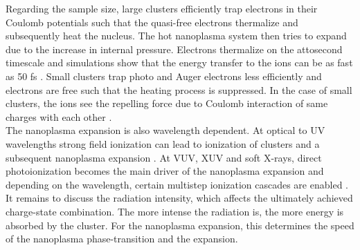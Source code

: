 Regarding the sample size, large clusters efficiently trap electrons in their Coulomb potentials such that the quasi-free electrons thermalize and subsequently heat the nucleus. The hot nanoplasma system then tries to expand due to the increase in internal pressure. Electrons thermalize on the attosecond timescale and simulations show that the energy transfer to the ions can be as fast as 50 fs \citep{Arbeiter-2010-PRA}. Small clusters trap photo and Auger electrons less efficiently and electrons are free such that the heating process is suppressed. In the case of small clusters, the ions see the repelling force due to Coulomb interaction of same charges with each other \citep{Lezius-1998-PRL}.\\
The nanoplasma expansion is also wavelength dependent. At optical to UV wavelengths strong field ionization can lead to ionization of clusters and a subsequent nanoplasma expansion \citep{Springate-2000-PRA}. At VUV, XUV and soft X-rays, direct photoionization becomes the main driver of the nanoplasma expansion and depending on the wavelength, certain multistep ionization cascades are enabled \citep{Arbeiter-2011-NJP}. It remains to discuss the radiation intensity, which affects the ultimately achieved charge-state combination. The more intense the radiation is, the more energy is absorbed by the cluster. For the nanoplasma expansion, this determines the speed of the nanoplasma phase-transition and the expansion.
%
%
%

